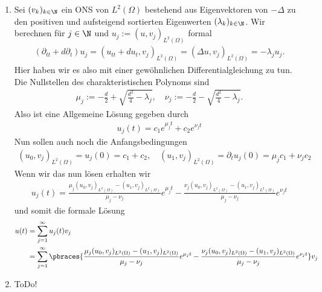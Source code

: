 \begin{solution}
\begin{enumerate}[label = (\roman*)]
    \item Sei $(v_k)_{k \in \N}$ ein ONS von $L^2(\Omega)$ bestehend aus Eigenvektoren von $- \Delta $ zu den positiven und aufsteigend sortierten Eigenwerten $(\lambda_k)_{k \in \N}$. Wir berechnen für $j \in \N$ und $u_j := (u,v_j)_{L^2(\Omega)}$ formal 
    \begin{align*}
    	(\partial_{tt} + d \partial_t)u_j = (u_{tt} + du_t, v_j)_{L^2(\Omega)} = (\Delta u, v_j)_{L^2(\Omega)} = -\lambda_j u_j.
    \end{align*}
	Hier haben wir es also mit einer gewöhnlichen Differentialgleichung zu tun. Die Nullstellen des charakteristischen Polynoms sind
	\begin{align*}
		\mu_j := - \frac{d}{2} + \sqrt{\frac{d^2}{4} - \lambda_j}, \quad \nu_j := - \frac{d}{2} - \sqrt{\frac{d^2}{4} - \lambda_j}.
	\end{align*}
	Also ist eine Allgemeine Lösung gegeben durch
	\begin{align*}
		u_j(t) = c_1 e^{\mu_j t} + c_2 e^{\nu_j t}
	\end{align*}
	Nun sollen auch noch die Anfangsbedingungen
	\begin{align*}
		(u_0, v_j)_{L^2(\Omega)} = u_j(0) = c_1 + c_2, \quad (u_1, v_j)_{L^2(\Omega)} = \partial_t u_j(0) = \mu_j c_1 + \nu_j c_2
	\end{align*}
	Wenn wir das nun lösen erhalten wir
	\begin{align*}
		u_j(t) = \frac{\mu_j(u_0, v_j)_{L^2(\Omega)} - (u_1, v_j)_{L^2(\Omega)}}{\mu_j - \nu_j} e^{\mu_j t} - \frac{\nu_j(u_0, v_j)_{L^2(\Omega)} - (u_1, v_j)_{L^2(\Omega)}}{\mu_j - \nu_j} e^{\nu_j t}
	\end{align*}
	und somit die formale Lösung
	\begin{align*}
		u(t) &= \sum_{j=1}^\infty u_j(t) v_j \\
		&= \sum_{j=1}^\infty \pbraces{\frac{\mu_j(u_0, v_j)_{L^2(\Omega)} - (u_1, v_j)_{L^2(\Omega)}}{\mu_j - \nu_j} e^{\mu_j t} - \frac{\nu_j(u_0, v_j)_{L^2(\Omega)} - (u_1, v_j)_{L^2(\Omega)}}{\mu_j - \nu_j} e^{\nu_j t}} v_j
	\end{align*}
	
	\item ToDo!
\end{enumerate}
    
\end{solution}

